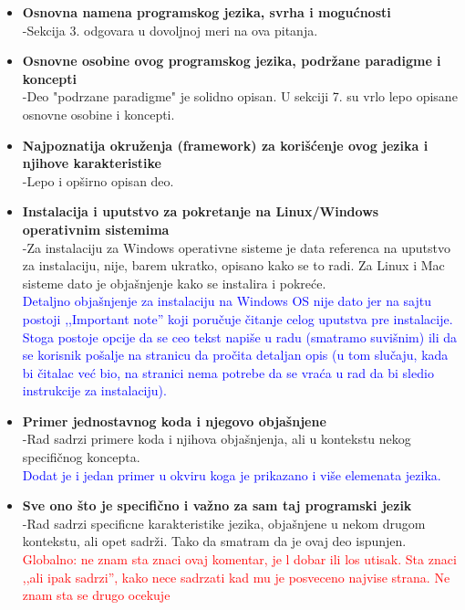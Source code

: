 \documentclass[a4paper]{report}
\newcommand{\odgovorAutora}[1]{\textcolor{blue}{#1}}
\newcommand{\note}[1]{\textcolor{red}{#1}}
\begin{document}
\begin{enumerate}
\begin{itemize}
    \item \textbf {Osnovna namena programskog jezika, svrha i mogućnosti}\\
      -Sekcija 3. odgovara u dovoljnoj meri na ova pitanja.
    \item \textbf {Osnovne osobine ovog programskog jezika, podržane paradigme i koncepti}\\
      -Deo "podrzane paradigme" je solidno opisan. U sekciji 7. su vrlo lepo opisane osnovne osobine i koncepti.
    \item \textbf {Najpoznatija okruženja (framework) za korišćenje ovog jezika i njihove karakteristike}\\
      -Lepo i op\v sirno opisan deo.
    \item \textbf {Instalacija i uputstvo za pokretanje na Linux/Windows operativnim sistemima} \\
       -Za instalaciju za Windows operativne sisteme je data referenca na uputstvo za instalaciju, nije, barem ukratko, opisano kako se to radi. Za Linux i Mac sisteme dato je obja\v snjenje kako se instalira i pokre\' ce. \\
\odgovorAutora{Detaljno objašnjenje za instalaciju na Windows OS nije dato jer na sajtu postoji ,,Important note'' koji poručuje čitanje celog uputstva pre instalacije. Stoga postoje opcije da se ceo tekst napiše u radu (smatramo suvišnim) ili da se korisnik pošalje na stranicu da pročita detaljan opis (u tom slučaju, kada bi čitalac već bio, na stranici nema potrebe da se vraća u rad da bi sledio instrukcije za instalaciju).}
    \item \textbf {Primer jednostavnog koda i njegovo objašnjene}\\
      -Rad sadrzi primere koda i njihova obja\v snjenja, ali u kontekstu nekog specifi\v cnog koncepta. \\
\odgovorAutora{Dodat je i jedan primer u okviru koga je prikazano i više elemenata jezika.}
    \item \textbf {Sve ono što je specifično i važno za sam taj programski jezik} \\
      -Rad sadrzi specificne karakteristike jezika, obja\v snjene u nekom drugom kontekstu, ali opet sadr\v zi. Tako da smatram da je ovaj deo ispunjen.
\note{Globalno: ne znam sta znaci ovaj komentar, je l dobar ili los utisak. Sta znaci ,,ali ipak sadrzi'', kako nece sadrzati kad mu je posveceno najvise strana. Ne znam sta se drugo ocekuje}
\end{itemize}


\end{enumerate}
\end{document}
